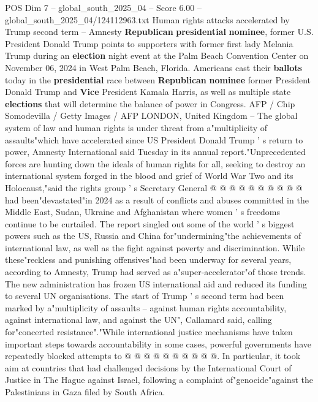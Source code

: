 \begin{textsample}{POS Dim 7 – global\_south\_2025\_04 – Score 6.00 – global\_south\_2025\_04/124112963.txt}  \label{ex:f7_pos_406}
Human rights attacks accelerated by Trump second term -- Amnesty \textbf{Republican} \textbf{presidential} \textbf{nominee}, former U.S.
President Donald Trump points to supporters with former first lady Melania Trump during an \textbf{election} night event at the Palm Beach Convention Center on November 06, 2024 in West Palm Beach, Florida.
Americans cast their \textbf{ballots} today in the \textbf{presidential} race between \textbf{Republican} \textbf{nominee} former President Donald Trump and \textbf{Vice} President Kamala Harris, as well as multiple state \textbf{elections} that will determine the balance of power in Congress.
AFP / Chip Somodevilla / Getty Images / AFP LONDON, United Kingdom -- The global system of law and human rights is under threat from a"multiplicity of assaults"which have accelerated since US President Donald Trump ' s return to power, Amnesty International said Tuesday in its annual report."Unprecedented forces are hunting down the ideals of human rights for all, seeking to destroy an international system forged in the blood and grief of World War Two and its Holocaust,"said the rights group ' s Secretary General @ @ @ @ @ @ @ @ @ @ had been"devastated"in 2024 as a result of conflicts and abuses committed in the Middle East, Sudan, Ukraine and Afghanistan where women ' s freedoms continue to be curtailed.
The report singled out some of the world ' s biggest powers such as the US, Russia and China for"undermining"the achievements of international law, as well as the fight against poverty and discrimination.
While these"reckless and punishing offensives"had been underway for several years, according to Amnesty, Trump had served as a"super-accelerator"of those trends.
The new administration has frozen US international aid and reduced its funding to several UN organisations.
The start of Trump ' s second term had been marked by a"multiplicity of assaults -- against human rights accountability, against international law, and against the UN", Callamard said, calling for"concerted resistance"."While international justice mechanisms have taken important steps towards accountability in some cases, powerful governments have repeatedly blocked attempts to @ @ @ @ @ @ @ @ @ @.
In particular, it took aim at countries that had challenged decisions by the International Court of Justice in The Hague against Israel, following a complaint of"genocide"against the Palestinians in Gaza filed by South Africa.

\end{textsample}
